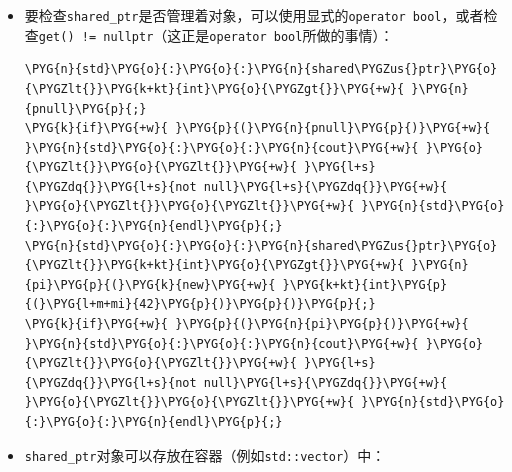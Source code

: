 \begin{itemize}

\item 要检查\texttt{shared\_\allowbreak{}ptr}是否管理着对象，可以使用显式的\texttt{operator bool}，或者检查\texttt{get() != nullptr}（这正是\texttt{operator bool}所做的事情）：



\begin{codeblockbg}
\begin{Verbatim}[commandchars=\\\{\},breaklines=true,breakanywhere=true,fontsize=\codefont,xleftmargin=17bp]
\PYG{n}{std}\PYG{o}{:}\PYG{o}{:}\PYG{n}{shared\PYGZus{}ptr}\PYG{o}{\PYGZlt{}}\PYG{k+kt}{int}\PYG{o}{\PYGZgt{}}\PYG{+w}{ }\PYG{n}{pnull}\PYG{p}{;}
\PYG{k}{if}\PYG{+w}{ }\PYG{p}{(}\PYG{n}{pnull}\PYG{p}{)}\PYG{+w}{ }\PYG{n}{std}\PYG{o}{:}\PYG{o}{:}\PYG{n}{cout}\PYG{+w}{ }\PYG{o}{\PYGZlt{}}\PYG{o}{\PYGZlt{}}\PYG{+w}{ }\PYG{l+s}{\PYGZdq{}}\PYG{l+s}{not null}\PYG{l+s}{\PYGZdq{}}\PYG{+w}{ }\PYG{o}{\PYGZlt{}}\PYG{o}{\PYGZlt{}}\PYG{+w}{ }\PYG{n}{std}\PYG{o}{:}\PYG{o}{:}\PYG{n}{endl}\PYG{p}{;}
\PYG{n}{std}\PYG{o}{:}\PYG{o}{:}\PYG{n}{shared\PYGZus{}ptr}\PYG{o}{\PYGZlt{}}\PYG{k+kt}{int}\PYG{o}{\PYGZgt{}}\PYG{+w}{ }\PYG{n}{pi}\PYG{p}{(}\PYG{k}{new}\PYG{+w}{ }\PYG{k+kt}{int}\PYG{p}{(}\PYG{l+m+mi}{42}\PYG{p}{)}\PYG{p}{)}\PYG{p}{;}
\PYG{k}{if}\PYG{+w}{ }\PYG{p}{(}\PYG{n}{pi}\PYG{p}{)}\PYG{+w}{ }\PYG{n}{std}\PYG{o}{:}\PYG{o}{:}\PYG{n}{cout}\PYG{+w}{ }\PYG{o}{\PYGZlt{}}\PYG{o}{\PYGZlt{}}\PYG{+w}{ }\PYG{l+s}{\PYGZdq{}}\PYG{l+s}{not null}\PYG{l+s}{\PYGZdq{}}\PYG{+w}{ }\PYG{o}{\PYGZlt{}}\PYG{o}{\PYGZlt{}}\PYG{+w}{ }\PYG{n}{std}\PYG{o}{:}\PYG{o}{:}\PYG{n}{endl}\PYG{p}{;}
\end{Verbatim}
\end{codeblockbg}



\item \texttt{shared\_\allowbreak{}ptr}对象可以存放在容器（例如\texttt{std::\allowbreak{}vector}）中：




\end{itemize}
